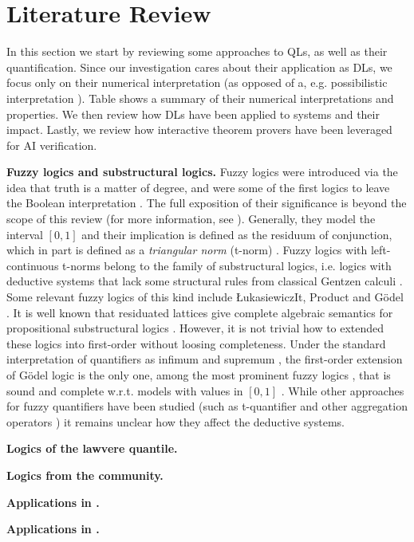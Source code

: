 \section{Literature Review} \label{section:LiteratureReview}

In this section we start by reviewing some approaches to QLs, as well as their quantification. Since our investigation cares about their application as DLs, we focus only on their numerical interpretation (as opposed of a, e.g. possibilistic interpretation \mcita{}). Table \mcita{} shows a summary of their numerical interpretations and properties. We then review how DLs have been applied to \InAI{} systems and their impact. Lastly, we review how interactive theorem provers have been leveraged for AI verification.

\textbf{Fuzzy logics and substructural logics.} Fuzzy logics were introduced via the idea that truth is a matter of degree, and were some of the first logics to leave the Boolean interpretation \mcita{}. The full exposition of their significance is beyond the scope of this review (for more information, see \mcita{}). Generally, they model the interval $[0,1]$ and their implication is defined as the residuum of conjunction, which in part is defined as a \emph{triangular norm} (t-norm) \mcita{}. Fuzzy logics with left-continuous t-norms belong to the family of substructural logics, i.e. logics with deductive systems that lack some structural rules from classical Gentzen calculi \mcita{}. Some relevant fuzzy logics of this kind include ŁukasiewiczIt, Product and G\"{o}del \mcita{}. It is well known that residuated lattices give complete algebraic semantics for propositional substructural logics \mcita{}. However, it is not trivial how to extended these logics into first-order without loosing completeness. Under the standard interpretation of quantifiers as infimum and supremum \mcita{}, the first-order extension of Gödel logic is the only one, among the most prominent fuzzy logics \mcita{}, that is sound and complete w.r.t. models with values in $[0,1]$ \mcita{}. While other approaches for fuzzy quantifiers have been studied (such as t-quantifier and other aggregation operators \mcita{}) it remains unclear how they affect the deductive systems.

\textbf{Logics of the lawvere quantile.}

\textbf{Logics from the \InAI{} community.}

\textbf{Applications in \InAI{}.}

\textbf{Applications in \InAI{}.}

\TODO
